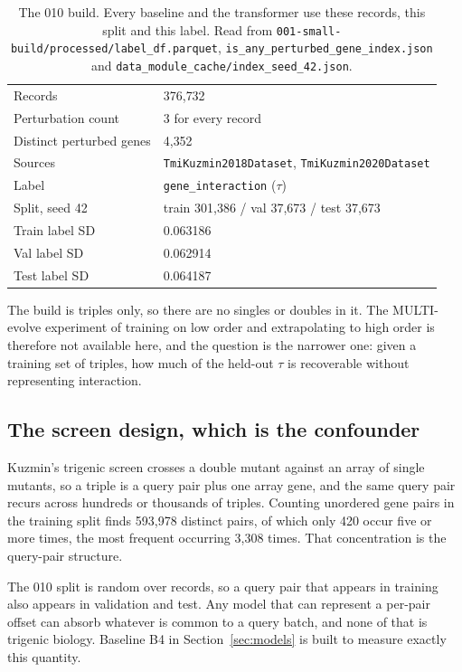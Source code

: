 \begin{table}[htbp]
\centering
\begin{tabular}{ll}
\hline
Records & 376{,}732 \\
Perturbation count & 3 for every record \\
Distinct perturbed genes & 4{,}352 \\
Sources & \texttt{TmiKuzmin2018Dataset}, \texttt{TmiKuzmin2020Dataset} \\
Label & \texttt{gene\_interaction} ($\tau$) \\
Split, seed 42 & train 301{,}386 / val 37{,}673 / test 37{,}673 \\
Train label SD & 0.063186 \\
Val label SD & 0.062914 \\
Test label SD & 0.064187 \\
\hline
\end{tabular}
\caption{The 010 build. Every baseline and the transformer use these records,
this split and this label. Read from
\texttt{001-small-build/processed/label\_df.parquet},
\texttt{is\_any\_perturbed\_gene\_index.json} and
\texttt{data\_module\_cache/index\_seed\_42.json}.}
\label{tab:build}
\end{table}

The build is triples only, so there are no singles or doubles in it. The
MULTI-evolve experiment of training on low order and extrapolating to high order
is therefore not available here, and the question is the narrower one: given a
training set of triples, how much of the held-out $\tau$ is recoverable without
representing interaction.

\subsection{The screen design, which is the confounder}

Kuzmin's trigenic screen crosses a  double mutant against an array of
single mutants, so a triple is a query pair plus one array gene, and the same
query pair recurs across hundreds or thousands of triples. Counting unordered
gene pairs in the training split finds 593{,}978 distinct pairs, of which only
420 occur five or more times, the most frequent occurring 3{,}308 times. That
concentration is the query-pair structure.

The 010 split is random over records, so a query pair that appears in training
also appears in validation and test. Any model that can represent a per-pair
offset can absorb whatever is common to a query batch, and none of that is
trigenic biology. Baseline B4 in Section~\ref{sec:models} is built to measure
exactly this quantity.
